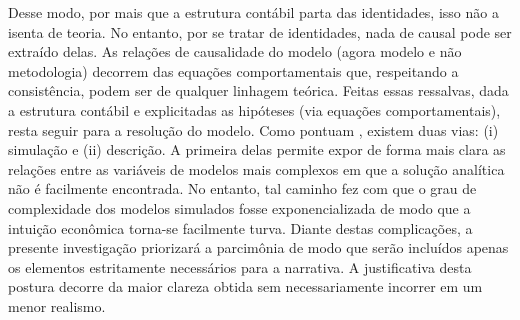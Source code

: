 Desse modo, por mais que a estrutura contábil parta das identidades, isso não a isenta de teoria. No entanto, por se tratar de identidades, nada de causal pode ser extraído delas. As relações de causalidade do modelo (agora modelo e não metodologia) decorrem das equações comportamentais que, respeitando a consistência, podem ser de qualquer linhagem teórica. Feitas essas ressalvas, dada a estrutura contábil e explicitadas as hipóteses (via equações comportamentais), resta seguir para a resolução do modelo. Como pontuam \textcite{caverzasi_stock-flow_2013}, existem duas vias: (i) simulação e (ii) descrição. A primeira delas permite expor de forma mais clara as relações entre as variáveis de modelos mais complexos em que a solução analítica não é facilmente encontrada. No entanto, tal caminho fez com que o grau de complexidade dos modelos simulados fosse exponencializada de modo que a intuição econômica torna-se facilmente turva. Diante destas complicações, a presente investigação priorizará a parcimônia de modo que serão incluídos apenas os elementos estritamente necessários para a narrativa. A justificativa desta postura decorre da maior clareza obtida sem necessariamente incorrer em um menor realismo. 